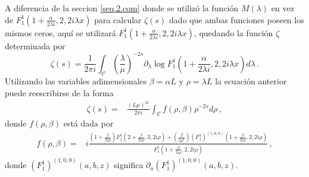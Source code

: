 A diferencia de la seccion \ref{seq.2.com} donde se utilizó la función $M (\lambda )$ en vez de $F _1 ^{1} \left( 1+\frac{ \alpha}{2 \lambda i },2,2 i \lambda x \right)$ para calcular $\zeta (s)$ dado que ambas funciones poseen los mismos ceros, aquí se utilizará 
$F _1 ^{1} \left( 1+\frac{ \alpha}{2 \lambda i },2,2 i \lambda x \right)$, quedando la función $\zeta$ determinada por
\begin{equation}
	\zeta (s) = 
	\frac{1}{2 \pi i} \int _{\mathcal{C}} 
						\left( \frac{\lambda}{\mu} \right) ^{-2s}
						\partial _ \lambda 
						\log F _1 ^{1} 
						\left( 1+\frac{ \alpha}{2 \lambda i },
							2,2 i \lambda x 
							\right)												
						d \lambda
	\, .
\end{equation}
Utilizando las variables adimensionales $\beta = \alpha L$ y  $\rho = \lambda L$ la ecuación anterior puede reescribirse de la forma
\begin{align}
\label{eq.ultima.int}
	\zeta (s) =& 
	\frac{\left(L \mu \right)^{2s}}{2 \pi i} \int _{\mathcal{C}} 
	f (\rho , \beta) \rho ^{-2s} d \rho 
\, ,
\end{align}
donde $f( \rho, \beta)$ está dada por
\begin{align}
f(\rho, \beta) =& 	
i
\frac{
		\left(1 + \frac{ \beta}{2 i \rho} \right) 
		F _1 ^1 
			\left( 2 + \frac{ \beta}{2 i \rho} ,3 ,2 i \rho \right)
		+ \left( \frac{\beta				
				}
				{2 \rho ^2 } 
				\right)
				( F _{1} ^1 ) ^{(1,0,0)}
				\left( 1 + \frac{\beta}{2 i \rho} ,2 ,2 i \rho
						\right)
		}
		{F _1 ^1 \left( 1 + \frac{\beta}{2 i \rho},2,2 i \rho \right)} 
\, ,	
\nonumber
\end{align}
donde $( F _{1} ^1 ) ^{(1,0,0)} (a,b,z)$ significa $ \partial _a ( F _{1} ^1 ) ^{(1,0,0)} (a,b,z)$.


